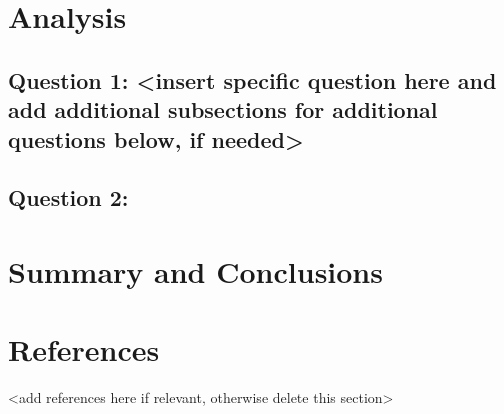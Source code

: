 \documentclass[
  12pt,
]{article}
\begin{document}
\newpage

\hypertarget{analysis}{%
\section{Analysis}\label{analysis}}

\hypertarget{question-1-insert-specific-question-here-and-add-additional-subsections-for-additional-questions-below-if-needed}{%
\subsection{Question 1: \textless insert specific question here and add
additional subsections for additional questions below, if
needed\textgreater{}}\label{question-1-insert-specific-question-here-and-add-additional-subsections-for-additional-questions-below-if-needed}}

\hypertarget{question-2}{%
\subsection{Question 2:}\label{question-2}}

\newpage

\hypertarget{summary-and-conclusions}{%
\section{Summary and Conclusions}\label{summary-and-conclusions}}

\newpage

\hypertarget{references}{%
\section{References}\label{references}}

\textless add references here if relevant, otherwise delete this
section\textgreater{}
\end{document}
